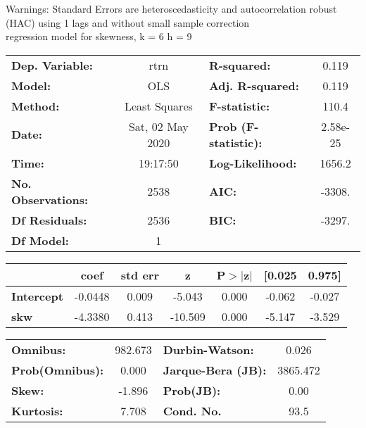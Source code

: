 Warnings: \newline
 [1] Standard Errors are heteroscedasticity and autocorrelation robust (HAC) using 1 lags and without small sample correction\\ 

regression model for skewness, k = 6 h = 9\begin{center}
\begin{tabular}{lclc}
\toprule
\textbf{Dep. Variable:}    &       rtrn       & \textbf{  R-squared:         } &     0.119   \\
\textbf{Model:}            &       OLS        & \textbf{  Adj. R-squared:    } &     0.119   \\
\textbf{Method:}           &  Least Squares   & \textbf{  F-statistic:       } &     110.4   \\
\textbf{Date:}             & Sat, 02 May 2020 & \textbf{  Prob (F-statistic):} &  2.58e-25   \\
\textbf{Time:}             &     19:17:50     & \textbf{  Log-Likelihood:    } &    1656.2   \\
\textbf{No. Observations:} &        2538      & \textbf{  AIC:               } &    -3308.   \\
\textbf{Df Residuals:}     &        2536      & \textbf{  BIC:               } &    -3297.   \\
\textbf{Df Model:}         &           1      & \textbf{                     } &             \\
\bottomrule
\end{tabular}
\begin{tabular}{lcccccc}
                   & \textbf{coef} & \textbf{std err} & \textbf{z} & \textbf{P$> |$z$|$} & \textbf{[0.025} & \textbf{0.975]}  \\
\midrule
\textbf{Intercept} &      -0.0448  &        0.009     &    -5.043  &         0.000        &       -0.062    &       -0.027     \\
\textbf{skw}       &      -4.3380  &        0.413     &   -10.509  &         0.000        &       -5.147    &       -3.529     \\
\bottomrule
\end{tabular}
\begin{tabular}{lclc}
\textbf{Omnibus:}       & 982.673 & \textbf{  Durbin-Watson:     } &    0.026  \\
\textbf{Prob(Omnibus):} &   0.000 & \textbf{  Jarque-Bera (JB):  } & 3865.472  \\
\textbf{Skew:}          &  -1.896 & \textbf{  Prob(JB):          } &     0.00  \\
\textbf{Kurtosis:}      &   7.708 & \textbf{  Cond. No.          } &     93.5  \\
\bottomrule
\end{tabular}
\end{center}

